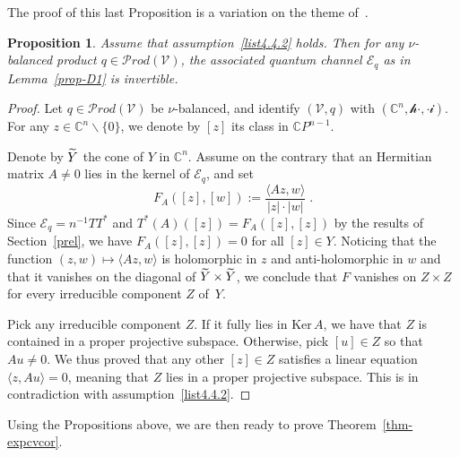 \documentclass[11pt]{article}
\newtheorem{prop}[theo]{Proposition}
\theoremstyle{definition}
\numberwithin{equation}{section}
\numberwithin{figure}{section}
\numberwithin{table}{section}
\newcommand{\CCC}{{\mathbb{C}}}
\newcommand{\cE}{{\mathcal{E}}}
\newcommand{\cV}{{\mathcal{V}}}
\renewcommand\tilde[1] {\stackrel{\sim}{\smash{#1}\rule{0pt}{1.1ex}}}
\newcommand\< {\mathcal{h}}
\renewcommand\> {\mathcal{i}}
\newcommand{\Prod}{{\mathcal Prod}}
\let\oldtilde\tilde
\renewcommand*{\tilde}[1]{\mathchoice{\widetilde{#1}}{\widetilde{#1}}{\oldtilde{#1}}{\oldtilde{#1}}}\let\oldhat\hat
\renewcommand*{\hat}[1]{\mathchoice{\widehat{#1}}{\widehat{#1}}{\oldhat{#1}}{\oldhat{#1}}}\let\oldforall\forall
\renewcommand*{\forall}{\mathrel{\oldforall}}
\begin{document}
The proof of this last Proposition is a variation on the theme of~\cite[Proposition~4.1]{BMS}.



\begin{prop}\label{prop-D3}
Assume that assumption~\eqref{list4.4.2} holds. Then for any $\nu$-balanced product $q\in\Prod(\cV)$, the associated quantum channel $\cE_q$ as in Lemma~\ref{prop-D1} is invertible.
\end{prop}


\begin{proof}
Let $q\in\Prod(\cV)$ be $\nu$-balanced, and
identify $(\cV,q)$ with $(\CCC^n,\<\cdot,\cdot\>)$. For any $z\in\CCC^n\backslash\{0\}$, we denote by $[z]$ its class in $\CCC P^{n-1}$.

Denote by $\tilde{Y}$ the cone of $Y$ in $\CCC^n$. Assume on the contrary that an Hermitian matrix $A \neq 0$ lies in the kernel of $\cE_q$, and set
\[
F_A([z],[w]):= \frac{\langle Az, w \rangle}{|z|\cdot |w|}\;.
\]
Since $\cE_q= n^{-1} TT^*$ and $T^* (A) ([z]) = F_A([z],[z])$ by the results of Section~\ref{prel}, we have $F_A([z],[z]) =0$ for all $[z] \in Y$. Noticing that the function $(z,w) \mapsto \langle Az, w \rangle$ is holomorphic in $z$ and anti-holomorphic in $w$ and that it vanishes on the diagonal of $\tilde{Y} \times \tilde{Y}$, we conclude that $F$ vanishes on $Z \times Z$ for every irreducible component $Z$ of~$Y$.

Pick any irreducible component $Z$. If it fully lies in $\text{Ker}\, A$, we have that $Z$ is contained in a proper projective subspace. Otherwise, pick $[u] \in Z$ so that $Au \neq 0$. We thus proved that any other $[z] \in Z$ satisfies a linear equation $\langle z, Au \rangle = 0$, meaning that $Z$ lies in a proper projective subspace. This is in contradiction with assumption~\eqref{list4.4.2}.
\end{proof}



Using the Propositions above, we are then ready to prove Theorem~\ref{thm-expcvcor}.
\end{document}
